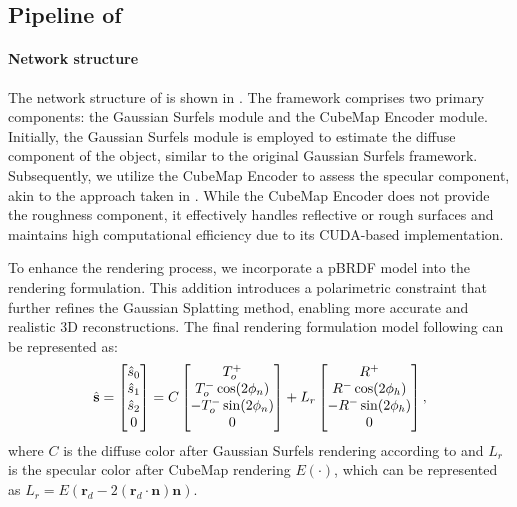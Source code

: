 \subsection{Pipeline of \polgs}
\label{sec:pipeline}

\paragraph{Network structure\quad}
The network structure of \polgs is shown in .
The framework comprises two primary components: the Gaussian Surfels module and the CubeMap Encoder module. 
Initially, the Gaussian Surfels module is employed to estimate the diffuse component of the object, similar to the original Gaussian Surfels framework. Subsequently, we utilize the CubeMap Encoder 
to assess the specular component, akin to the approach taken in \dr. While the CubeMap Encoder does not provide the roughness component, it effectively handles reflective or rough surfaces and maintains high computational efficiency due to its CUDA-based implementation. 

To enhance the rendering process, we incorporate a pBRDF model into the rendering formulation. 
This addition introduces a polarimetric constraint that further refines the Gaussian Splatting method, 
enabling more accurate and realistic 3D reconstructions.
The final rendering formulation model following 
can be represented as:
\begin{equation}
    \hat{\mathbf{s}} = \begin{bmatrix}
        \hat{s}_0 \\
        \hat{s}_1 \\
        \hat{s}_2 \\
        0
    \end{bmatrix}=C \begin{bmatrix}
        T_o^+ \\
        T_o^- \cos(2 \phi_n) \\
        - T_o^- \sin(2 \phi_n) \\
        0
    \end{bmatrix}+ L_r\begin{bmatrix}
        R^+ \\
        R^- \cos(2 \phi_h) \\
        -R^- \sin(2 \phi_h) \\
        0
    \end{bmatrix},
\label{eq:final_stokes}
\end{equation}
where $C$ is the diffuse color after Gaussian Surfels rendering according to  and 
$L_r$ is the specular color after CubeMap rendering $E(\cdot)$, which can be represented as 
$L_r = E(\textbf{r}_d-2(\textbf{r}_d\cdot \textbf{n})\textbf{n})$.

